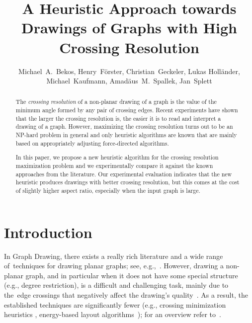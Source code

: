 \documentclass[runningheads]{llncs}
\author{Michael~A.~Bekos, Henry~F\"orster, Christian~Geckeler, Lukas Holl\"ander, Michael~Kaufmann, Amad\"aus~M.~Spallek, Jan~Splett}
\title{A Heuristic Approach towards Drawings of Graphs with High Crossing Resolution}
\institute{
Wilhelm-Schickhard-Institut f\"ur Informatik, Universit\"at T\"ubingen, Germany\\
\texttt{\{bekos,foersth,geckeler,mk\}@informatik.uni-tuebingen.de}\\
\texttt{\{jan-lukas.hollaender,amadaeus.spallek,jan.splett\} @student.uni-tuebingen.de}
}
\begin{document}
\maketitle
\linenumbers

\begin{abstract}
The \emph{crossing resolution} of a non-planar drawing of a graph is the value of the minimum angle formed by any pair of crossing edges. Recent experiments have shown that the larger the crossing resolution is, the easier it is to read and interpret a drawing of a graph. However, maximizing the crossing resolution turns out to be an NP-hard problem in general and only heuristic algorithms are known that are mainly based on appropriately adjusting force-directed algorithms.

In this paper, we propose a new heuristic algorithm for the crossing resolution maximization problem and we experimentally compare it against the known approaches from the literature. Our experimental evaluation indicates that the new heuristic produces drawings with better crossing resolution, but this comes at the cost of slightly higher aspect ratio, especially when the input graph is large.
\end{abstract}

\section{Introduction}
\label{sec:introduction}

In Graph Drawing, there exists a really rich literature and a wide range of~techniques for drawing planar graphs; see, e.g.,~\cite{DBLP:journals/combinatorica/FraysseixPP90,DBLP:conf/gd/GutwengerM98,DBLP:journals/algorithmica/Kant96}. However, drawing a non-planar graph, and in particular when it does not have some special structure (e.g., degree restriction), is a difficult and challenging task, mainly due to the~edge crossings that negatively affect the drawing's quality~\cite{DBLP:journals/iwc/Purchase00}. As a result, the established techniques are significantly fewer (e.g., crossing minimization heuristics \cite{DBLP:journals/algorithmica/EadesW94,DBLP:journals/tsmc/SugiyamaTT81}, energy-based layout algorithms~\cite{DBLP:journals/congnum/Eades84,DBLP:journals/spe/FruchtermanR91}); for an overview refer to~\cite{DBLP:books/ph/BattistaETT99,DBLP:conf/dagstuhl/1999dg,DBLP:reference/crc/2013gd}.
\end{document}
